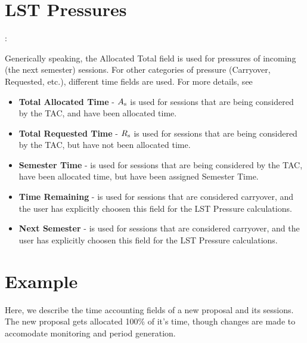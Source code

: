 \documentclass{article}
\begin{document}
\section{LST Pressures}:

   Generically speaking, the Allocated Total field is used for pressures of incoming (the next semester) sessions.  For other categories of pressure (Carryover, Requested, etc.), different time fields are used.  For more details, see \cite{marganian12a}

\begin{itemize}   
\item {\bf Total Allocated Time}  - $A_{\rm s}$ is used for sessions that are being considered by the TAC, and have been allocated time.
\item {\bf Total Requested Time} - $R_{\rm s}$ is used for sessions that are being considered by the TAC, but have not been allocated time.
\item {\bf Semester Time} - is used for sessions that are being considered by the TAC, have been allocated time, but have been assigned Semester Time.
\item {\bf Time Remaining }- is used for sessions that are considered carryover, and the user has explicitly choosen this field for the LST Pressure calculations.
\item {\bf Next Semester } - is used for sessions that are considered carryover, and the user has explicitly choosen this field for the LST Pressure calculations.  
\end{itemize}   

\section{Example}

Here, we describe the time accounting fields of a new proposal and its sessions.  The new proposal gets allocated 100\% of it's time, though changes are made to accomodate monitoring and period generation.
\end{document}

